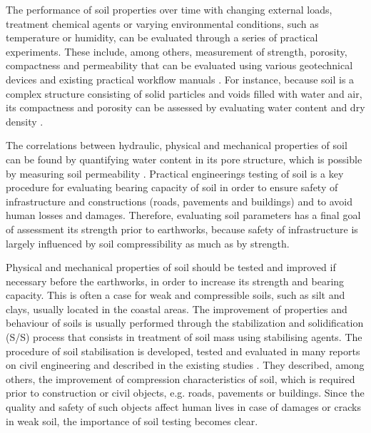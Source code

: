 \documentclass{amestyle}
\begin{document}
The performance of soil properties over time with changing external loads, treatment chemical agents or varying environmental conditions, such as temperature or humidity, can be evaluated through a series of practical experiments. These include, among others, measurement of strength, porosity, compactness and permeability that can be evaluated using various geotechnical devices and existing practical workflow manuals \cite{Day2001,Davis2008}. For instance, because soil is a complex structure consisting of solid particles and voids filled with water and air, its compactness and porosity can be assessed by evaluating water content and dry density \cite{Hillel}. 

The correlations between hydraulic, physical and mechanical properties of soil can be found by quantifying water content in its pore structure, which is possible by measuring soil permeability \cite{BARBOSA2022115673}. Practical engineerings testing of soil is a key procedure for evaluating bearing capacity of soil in order to ensure safety of infrastructure and constructions (roads, pavements and buildings) and to avoid human losses and damages. Therefore, evaluating soil parameters has a final goal of assessment its strength prior to earthworks, because safety of infrastructure is largely influenced by soil compressibility as much as by strength.

Physical and mechanical properties of soil should be tested and improved if necessary before the earthworks, in order to increase its strength and bearing capacity. This is often a case for weak and compressible soils, such as silt and clays, usually located in the coastal areas. The improvement of properties and behaviour of soils is usually performed through the stabilization and solidification (S/S) process that consists in treatment of soil mass using stabilising agents. The procedure of soil stabilisation is developed, tested and evaluated in many reports on civil engineering and described in the existing studies \cite{Jauberthie,Lindh202102,ArabiWild,Lindh2004}. They described, among others, the improvement of compression characteristics of soil, which is required prior to construction or civil objects, e.g. roads, pavements or buildings. Since the quality and safety of such objects affect human lives in case of damages or cracks in weak soil, the importance of soil testing becomes clear. 
\end{document}
